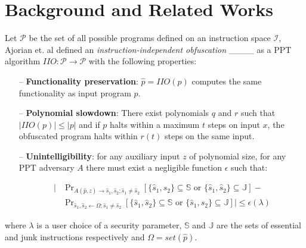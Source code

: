 \section{Background and Related Works}
\label{sec:background}

Let $\mathcal{P}$ be the set of all possible programs defined on an instruction space $\mathcal{I}$, Ajorian et. al defined an \textit{instruction-independent obfuscation} ____ as a PPT algorithm $IIO:\mathcal{P}\rightarrow \mathcal{P}$  with the following properties:

\begin{itemize}
	\item[--] \textbf{Functionality preservation}: $\hat p = IIO(p)$ computes the same functionality as input program $p$.
	\item[--] \textbf{Polynomial slowdown}: There exist polynomials $q$ and $r$ such that $|IIO(p)| \leq |p|$ and if $p$ halts within a maximum $t$ steps on input $x$, the obfuscated program halts within $r(t)$ steps on the same input.
	\item[--] \textbf{Unintelligibility}: for any auxiliary input $z$ of polynomial size, for any PPT adversary $A$ there must exist a negligible function $\epsilon$ such that:

	\begin{equation}
	\label{eq:s_unintelligibility}
	\begin{split}
		\big| & \Pr\nolimits_{A(\hat p, z)\rightarrow \hat s_1, \hat s_2; \hat s_1 \neq \hat s_2}[\{\hat s_1, \hat s_2\} \subseteq \mathbb{S} \text{ or } \{\hat s_1, \hat s_2\} \subseteq \mathbb{J}] - \\ 
      		& \Pr\nolimits_{\hat s_1, \hat s_2 \leftarrow \Omega ; \hat s_1 \neq \hat s_2}[\{\hat s_1, \hat s_2\} \subseteq \mathbb{S} \text{ or } \{\hat s_1, \hat s_2\} \subseteq \mathbb{J}] \big| \leq \epsilon(\lambda)
	\end{split}
	\end{equation}
\end{itemize}
where $\lambda$ is a user choice of a security parameter, $\mathbb{S}$ and $\mathbb{J}$ are the sets of essential and junk instructions respectively and $\Omega=set(\hat p)$.